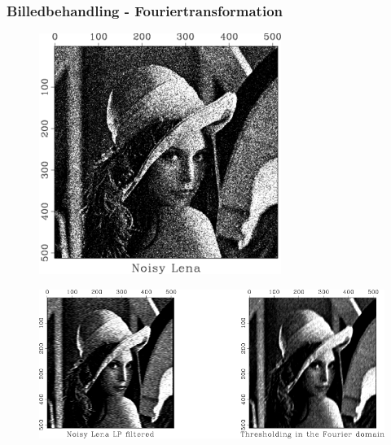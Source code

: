 \documentclass[12pt,t]{beamer}
\begin{document}
\begin{frame}
\frametitle{Billedbehandling - Fouriertransformation}
\begin{figure}[H]
\includegraphics[scale=0.29]{img/billedbeh/lenaex3.png}
\end{figure}
\begin{figure}[H]
\includegraphics[scale=0.29]{img/billedbeh/lenaex1.png}
\end{figure}
\end{frame}

% 
\end{document}
